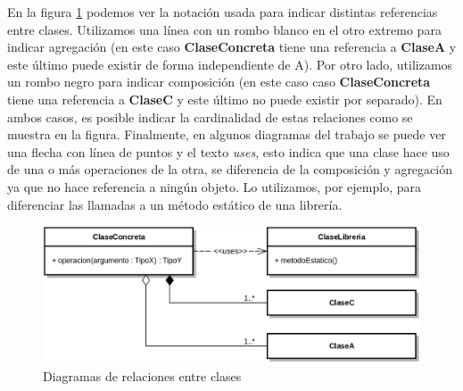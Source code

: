 En la figura \ref{fig:png_arquitectura} podemos ver la notación usada para indicar distintas referencias entre clases. Utilizamos una línea con un rombo blanco en el otro extremo para indicar agregación (en este caso \textbf{ClaseConcreta} tiene una referencia a \textbf{ClaseA} y este último puede existir de forma independiente de A). Por otro lado, utilizamos un rombo negro para indicar composición (en este caso caso \textbf{ClaseConcreta} tiene una referencia a \textbf{ClaseC} y este último no puede existir por separado). En ambos casos, es posible indicar la cardinalidad de estas relaciones como se muestra en la figura. Finalmente, en algunos diagramas del trabajo se puede ver una flecha con línea de puntos y el texto \emph{uses}, esto indica que una clase hace uso de una o más operaciones de la otra, se diferencia de la composición y agregación ya que no hace referencia a ningún objeto. Lo utilizamos, por ejemplo, para diferenciar las llamadas a un método estático de una librería.

\begin{figure}[H]
  	\centering
	\includegraphics[scale=0.17]{img/ref_comp-agregation.png}
	\caption{Diagramas de relaciones entre clases}
  	\label{fig:png_arquitectura}
\end{figure}


